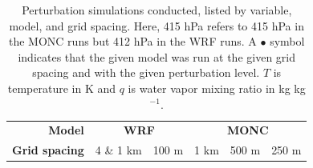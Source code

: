 \documentclass[draft]{agujournal2019}
\begin{document}
{
\begin{table}[h!]
    \centering
    \caption{Perturbation simulations conducted, listed by variable, model, and
    grid spacing. Here, 415 hPa refers to 415 hPa in the MONC runs but 412 hPa
    in the WRF runs. A $\bullet{}$ symbol indicates that the given model was run
    at the given grid spacing and with the given perturbation level. $T$ is
    temperature in K and $q$ is water vapor mixing ratio in kg kg$^{-1}$.}
    \label{tab:pert_runs}
    \renewcommand{\arraystretch}{0.6}
    \footnotesize
    \begin{tabular}{llr|cc|ccc}
        \multicolumn{3}{r|}{\textbf{Model}} & \multicolumn{2}{c|}{\textbf{WRF}} & \multicolumn{3}{c}{\textbf{MONC}} \\
        \multicolumn{3}{r|}{\textbf{Grid spacing}} & 4 \& 1 km & 100 m & 1 km & 500 m & 250 m \\
        

\end{tabular}
\end{table}}
\end{document}
